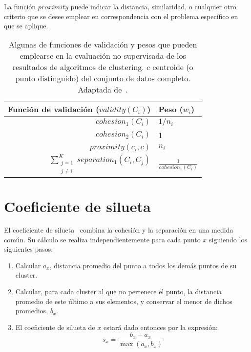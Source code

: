 La función $proximity$ puede indicar la distancia, similaridad, o cualquier otro criterio que se desee emplear en correspondencia con el problema específico en que se aplique.

\begin{table}[H]
    \centering
    \begin{tabular}{rl}
        \hline
        Función de validación ($validity(C_i)$)                        & Peso ($w_i$)                            \\                 \hline
        $cohesion_1(C_i)$                                              & $1/n_i$                                 \\
        $cohesion_2(C_i)$                                              & 1                                       \\
        $proximity(c_i , c)$                                           & $n_i$                                   \\
        $\sum_{\substack{j=1 \\ j\neq i}}^{K}{separation_1(C_i, C_j)}$ & $\frac{1}{cohesion_1(C_i)}$
    \end{tabular}
    \caption{Algunas de funciones de validación y pesos que pueden emplearse en la evaluación no supervisada de los resultados de algoritmos de clustering. $c$ centroide (o punto distinguido) del conjunto de datos completo.
    Adaptada de~\cite{Tan05}.}
    \label{table:validity-weights}
\end{table}

\section{Coeficiente de silueta}\label{sec:coeficienteDeSilueta}

El coeficiente de silueta~\cite{Rousseeuw87, Tan05} combina la cohesión y la separación en una medida común.
Su cálculo se realiza independientemente para cada punto $x$ siguiendo los siguientes pasos:

\begin{enumerate}
    \item Calcular $a_x$, distancia promedio del punto a todos los demás puntos de su cluster.
    \item Calcular, para cada cluster al que no pertenece el punto, la distancia promedio de este último a sus elementos, y conservar el menor de dichos promedios, $b_x$.
    \item El coeficiente de silueta de $x$ estará dado entonces por la expresión:
    \begin{equation}
        \label{eq:silhouette-coefficient}
        s_x = \frac{b_x - a_x}{\max{(a_x, b_x)}}
    \end{equation}
\end{enumerate}

